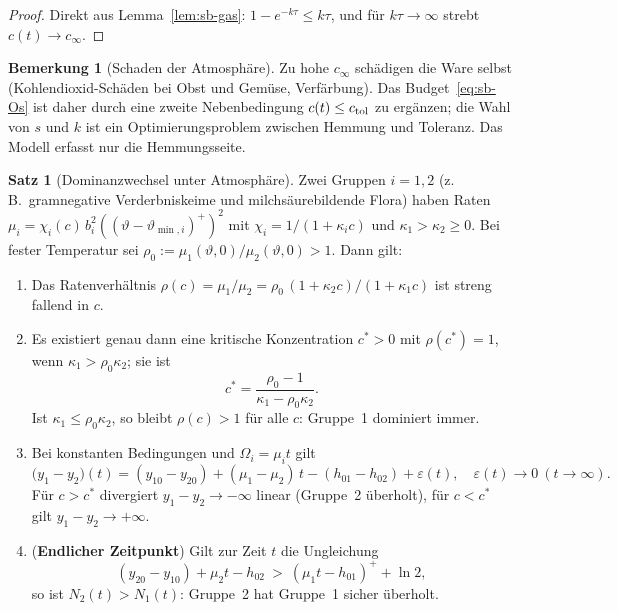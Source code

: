 \documentclass[a4paper, 12pt, twoside, openright]{report}
\theoremstyle{definition}
\theoremstyle{definition}
\newtheorem{satz}{Satz}[chapter]
\newtheorem{bemerkung}{Bemerkung}[chapter]
\begin{document}
\begin{proof}
Direkt aus Lemma~\ref{lem:sb-gas}: $1-e^{-k\tau}\le k\tau$, und für $k\tau\to\infty$
strebt $c(t)\to c_\infty$.
\end{proof}

\begin{bemerkung}[Schaden der Atmosphäre]
Zu hohe $c_\infty$ schädigen die Ware selbst (Kohlendioxid-Schäden bei Obst und Gemüse,
Verfärbung). Das Budget~\eqref{eq:sb-Os} ist daher durch eine zweite Nebenbedingung
$c(t)\le c_{\rm tol}$ zu ergänzen; die Wahl von $s$ und $k$ ist ein Optimierungsproblem
zwischen Hemmung und Toleranz. Das Modell erfasst nur die Hemmungsseite.
\end{bemerkung}

\begin{satz}[Dominanzwechsel unter Atmosphäre]\label{satz:sb-dominanz}
Zwei Gruppen $i=1,2$ (z.\,B.\ gramnegative Verderbniskeime und milchsäurebildende Flora)
haben Raten $\mu_i=\chi_i(c)\,b_i^2((\vartheta-\vartheta_{\min,i})^+)^2$ mit
$\chi_i=1/(1+\kappa_ic)$ und $\kappa_1>\kappa_2\ge0$. Bei fester Temperatur sei
$\rho_0:=\mu_1(\vartheta,0)/\mu_2(\vartheta,0)>1$. Dann gilt:
\begin{enumerate}
  \item Das Ratenverhältnis $\rho(c)=\mu_1/\mu_2=\rho_0\,(1+\kappa_2c)/(1+\kappa_1c)$ ist
    streng fallend in $c$.
  \item Es existiert genau dann eine kritische Konzentration $c^\ast>0$ mit $\rho(c^\ast)=1$, wenn
    $\kappa_1>\rho_0\kappa_2$; sie ist
    \begin{equation}
      c^\ast=\frac{\rho_0-1}{\kappa_1-\rho_0\kappa_2}.
      \label{eq:sb-cstar}
    \end{equation}
    Ist $\kappa_1\le\rho_0\kappa_2$, so bleibt $\rho(c)>1$ für alle $c$: Gruppe~1 dominiert
    immer.
  \item Bei konstanten Bedingungen und $\Omega_i=\mu_it$ gilt
    \[
      \bigl(y_1-y_2\bigr)(t)=(y_{10}-y_{20})+(\mu_1-\mu_2)\,t-(h_{01}-h_{02})+\varepsilon(t),\quad
      \varepsilon(t)\to0\ (t\to\infty).
    \]
    Für $c>c^\ast$ divergiert $y_1-y_2\to-\infty$ linear (Gruppe~2 überholt), für
    $c<c^\ast$ gilt $y_1-y_2\to+\infty$.
  \item (\textbf{Endlicher Zeitpunkt}) Gilt zur Zeit $t$ die Ungleichung
    \begin{equation}
      (y_{20}-y_{10})+\mu_2t-h_{02}\ >\ (\mu_1t-h_{01})^{+}+\ln2,
      \label{eq:sb-dom4}
    \end{equation}
    so ist $N_2(t)>N_1(t)$: Gruppe~2 hat Gruppe~1 sicher überholt.
\end{enumerate}
\end{satz}
\end{document}
